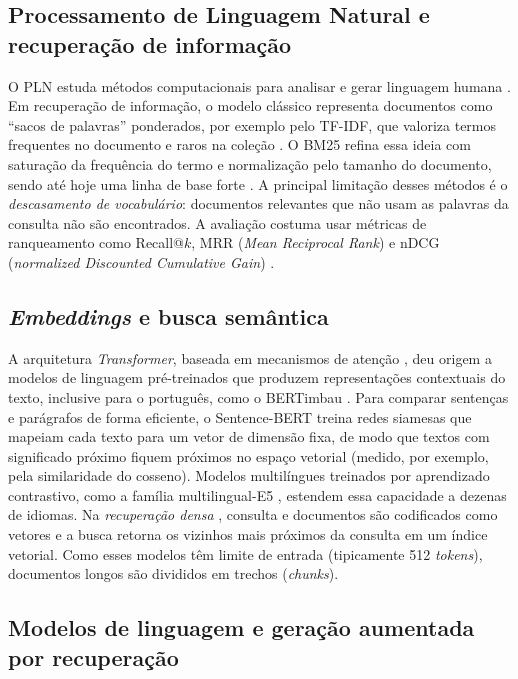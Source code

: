 \documentclass[12pt]{article}
\begin{document}
\subsection{Processamento de Linguagem Natural e recuperação de informação}

O PLN estuda métodos computacionais para analisar e gerar linguagem humana
\cite{jurafsky2025}. Em recuperação de informação, o modelo clássico representa documentos como
``sacos de palavras'' ponderados, por exemplo pelo TF-IDF, que valoriza termos frequentes no
documento e raros na coleção \cite{manning2008}. O BM25 refina essa ideia com saturação da
frequência do termo e normalização pelo tamanho do documento, sendo até hoje uma linha de base
forte \cite{robertson2009}. A principal limitação desses métodos é o \emph{descasamento de
vocabulário}: documentos relevantes que não usam as palavras da consulta não são encontrados. A
avaliação costuma usar métricas de ranqueamento como Recall@$k$, MRR (\textit{Mean Reciprocal
Rank}) e nDCG (\textit{normalized Discounted Cumulative Gain}) \cite{manning2008}.

\subsection{\textit{Embeddings} e busca semântica}

A arquitetura \textit{Transformer}, baseada em mecanismos de atenção \cite{vaswani2017}, deu
origem a modelos de linguagem pré-treinados que produzem representações contextuais do texto,
inclusive para o português, como o BERTimbau \cite{souza2020}. Para comparar sentenças e
parágrafos de forma eficiente, o Sentence-BERT \cite{reimers2019} treina redes siamesas que
mapeiam cada texto para um vetor de dimensão fixa, de modo que textos com significado próximo
fiquem próximos no espaço vetorial (medido, por exemplo, pela similaridade do cosseno). Modelos
multilíngues treinados por aprendizado contrastivo, como a família multilingual-E5
\cite{wang2024e5}, estendem essa capacidade a dezenas de idiomas. Na \emph{recuperação densa}
\cite{karpukhin2020}, consulta e documentos são codificados como vetores e a busca retorna os
vizinhos mais próximos da consulta em um índice vetorial. Como esses modelos têm limite de
entrada (tipicamente 512 \textit{tokens}), documentos longos são divididos em trechos
(\textit{chunks}).

\subsection{Modelos de linguagem e geração aumentada por recuperação}
\end{document}
